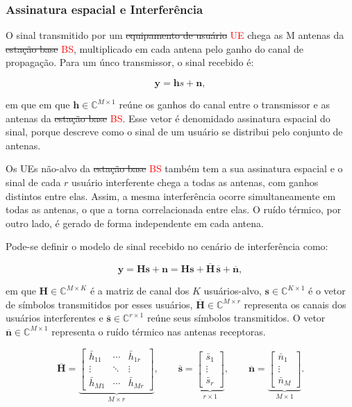 \subsubsection{Assinatura espacial e Interferência}
O sinal transmitido por um \sout{equipamento de usuário} \textcolor{red}{UE} chega as M antenas da \sout{estação base} \textcolor{red}{BS}, multiplicado em cada antena pelo ganho do canal de propagação. Para um únco transmissor, o sinal recebido é:

\[
\mathbf y=\mathbf h s+\mathbf n,
\]

em que em que $\mathbf h\in\mathbb C^{M\times1}$ reúne os ganhos do canal entre o transmissor e as antenas da \sout{estação base} \textcolor{red}{BS}. Esse vetor é denomidado assinatura espacial do sinal, porque descreve como o sinal de um usuário se distribui pelo conjunto de antenas.

Os UEs não-alvo da \sout{estação base} \textcolor{red}{BS} também tem a sua assinatura espacial e o sinal de cada $r$ usuário interferente chega a todas as antenas, com ganhos distintos entre elas. Assim, a mesma interferência ocorre simultaneamente em todas as antenas, o que a torna correlacionada entre elas. O ruído térmico, por outro lado, é gerado de forma independente em cada antena.

Pode-se definir o modelo de sinal recebido no cenário de interferência como:

\[
\mathbf y=
\mathbf H\mathbf s+\mathbf n=
\mathbf H\mathbf s+
\overline{\mathbf H}\,\overline{\mathbf s}
+\overline{\mathbf n},
\]

em que $\mathbf H\in\mathbb C^{M\times K}$ é a matriz de canal dos $K$ usuários-alvo, $\mathbf s\in\mathbb C^{K\times1}$ é o vetor de símbolos transmitidos por esses usuários, $\overline{\mathbf H}\in\mathbb C^{M\times r}$ representa os canais dos usuários interferentes e $\overline{\mathbf s}\in\mathbb C^{r\times1}$ reúne seus símbolos transmitidos. O vetor $\overline{\mathbf n}\in\mathbb C^{M\times1}$ representa o ruído térmico nas antenas receptoras.

\[
\overline{\mathbf H}=
\underbrace{\begin{bmatrix}
\bar h_{11} & \cdots & \bar h_{1r}\\
\vdots & \ddots & \vdots\\
\bar h_{M1} & \cdots & \bar h_{Mr}
\end{bmatrix}}_{M\times r},
\qquad
\overline{\mathbf s}=
\underbrace{\begin{bmatrix}\bar s_1\\ \vdots\\ \bar s_r\end{bmatrix}}_{r\times 1},
\qquad
\overline{\mathbf n}=
\underbrace{\begin{bmatrix}\bar n_1\\ \vdots\\ \bar n_M\end{bmatrix}}_{M\times 1}.
\]

